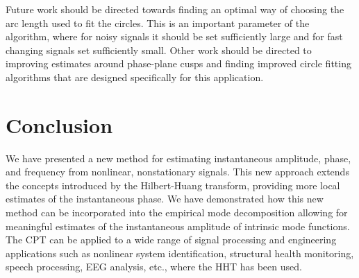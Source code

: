 \documentclass[11pt,draftcls,onecolumn]{IEEEtran}
\begin{document}
Future work should be directed towards finding an optimal way of choosing the arc length used to fit the circles. This is an important parameter of the algorithm, where for noisy signals it should be set sufficiently large and for fast changing signals set sufficiently small. Other work should be directed to improving estimates around phase-plane cusps and finding improved circle fitting algorithms that are designed specifically for this application.


\section{Conclusion}\label{sect:ConclusionSection}
We have presented a new method for estimating instantaneous amplitude, phase, and frequency from nonlinear, nonstationary signals. This new approach extends the concepts introduced by the Hilbert-Huang transform, providing more local estimates of the instantaneous phase. We have demonstrated how this new method can be incorporated into the empirical mode decomposition allowing for meaningful estimates of the instantaneous amplitude of intrinsic mode functions. The CPT can be applied to a wide range of signal processing and engineering applications such as nonlinear system identification, structural health monitoring, speech processing, EEG analysis, etc., where the HHT has been used. 

\end{document}
